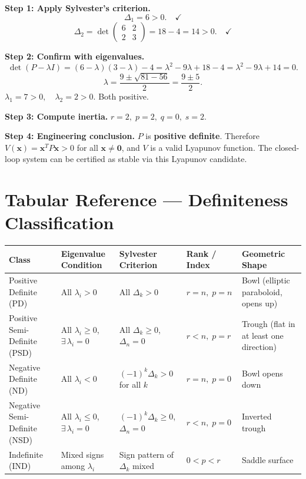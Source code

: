 \documentclass[12pt,a4paper]{article}
\begin{document}
\textbf{Step 1: Apply Sylvester's criterion.}
\[
\Delta_1 = 6 > 0. \quad \checkmark
\]
\[
\Delta_2 = \det\begin{pmatrix}6 & 2 \\ 2 & 3\end{pmatrix}
= 18 - 4 = 14 > 0. \quad \checkmark
\]

\textbf{Step 2: Confirm with eigenvalues.}
\[
\det(P - \lambda I) = (6-\lambda)(3-\lambda) - 4
= \lambda^2 - 9\lambda + 18 - 4 = \lambda^2 - 9\lambda + 14 = 0.
\]
\[
\lambda = \frac{9 \pm \sqrt{81 - 56}}{2} = \frac{9 \pm 5}{2}.
\]
\(\lambda_1 = 7 > 0,\quad \lambda_2 = 2 > 0\). Both positive.

\textbf{Step 3: Compute inertia.}
\(r = 2,\; p = 2,\; q = 0,\; s = 2\).

\textbf{Step 4: Engineering conclusion.}
\(P\) is \textbf{positive definite}. Therefore \(V(\mathbf{x}) = \mathbf{x}^{T} P \mathbf{x}
> 0\) for all \(\mathbf{x} \neq \mathbf{0}\), and \(V\) is a valid Lyapunov function.
The closed-loop system can be certified as stable via this Lyapunov candidate.

\section{Tabular Reference --- Definiteness Classification}

\begin{center}
\begin{tabular}{@{}p{2.8cm} p{3.5cm} p{3.5cm} p{2.3cm} p{2.8cm}@{}}
\toprule
\textbf{Class} &
\textbf{Eigenvalue Condition} &
\textbf{Sylvester Criterion} &
\textbf{Rank / Index} &
\textbf{Geometric Shape} \\
\midrule
Positive Definite (PD) &
  All \(\lambda_i > 0\) &
  All \(\Delta_k > 0\) &
  \(r = n,\; p = n\) &
  Bowl (elliptic paraboloid, opens up) \\
\addlinespace
Positive Semi-Definite (PSD) &
  All \(\lambda_i \geq 0\), \(\exists\,\lambda_i = 0\) &
  All \(\Delta_k \geq 0\), \(\Delta_n = 0\) &
  \(r < n,\; p = r\) &
  Trough (flat in at least one direction) \\
\addlinespace
Negative Definite (ND) &
  All \(\lambda_i < 0\) &
  \((-1)^k\Delta_k > 0\) for all \(k\) &
  \(r = n,\; p = 0\) &
  Bowl opens down \\
\addlinespace
Negative Semi-Definite (NSD) &
  All \(\lambda_i \leq 0\), \(\exists\,\lambda_i = 0\) &
  \((-1)^k\Delta_k \geq 0\), \(\Delta_n = 0\) &
  \(r < n,\; p = 0\) &
  Inverted trough \\
\addlinespace
Indefinite (IND) &
  Mixed signs among \(\lambda_i\) &
  Sign pattern of \(\Delta_k\) mixed &
  \(0 < p < r\) &
  Saddle surface \\
\bottomrule
\end{tabular}
\end{center}
\end{document}
